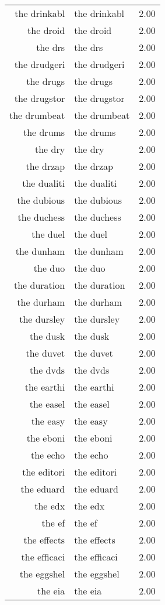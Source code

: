 \begin{table}[ht]
\begin{tabular}{rlr}
  the drinkabl & the drinkabl & 2.00 \\ 
  the droid & the droid & 2.00 \\ 
  the drs & the drs & 2.00 \\ 
  the drudgeri & the drudgeri & 2.00 \\ 
  the drugs & the drugs & 2.00 \\ 
  the drugstor & the drugstor & 2.00 \\ 
  the drumbeat & the drumbeat & 2.00 \\ 
  the drums & the drums & 2.00 \\ 
  the dry & the dry & 2.00 \\ 
  the drzap & the drzap & 2.00 \\ 
  the dualiti & the dualiti & 2.00 \\ 
  the dubious & the dubious & 2.00 \\ 
  the duchess & the duchess & 2.00 \\ 
  the duel & the duel & 2.00 \\ 
  the dunham & the dunham & 2.00 \\ 
  the duo & the duo & 2.00 \\ 
  the duration & the duration & 2.00 \\ 
  the durham & the durham & 2.00 \\ 
  the dursley & the dursley & 2.00 \\ 
  the dusk & the dusk & 2.00 \\ 
  the duvet & the duvet & 2.00 \\ 
  the dvds & the dvds & 2.00 \\ 
  the earthi & the earthi & 2.00 \\ 
  the easel & the easel & 2.00 \\ 
  the easy & the easy & 2.00 \\ 
  the eboni & the eboni & 2.00 \\ 
  the echo & the echo & 2.00 \\ 
  the editori & the editori & 2.00 \\ 
  the eduard & the eduard & 2.00 \\ 
  the edx & the edx & 2.00 \\ 
  the ef & the ef & 2.00 \\ 
  the effects & the effects & 2.00 \\ 
  the efficaci & the efficaci & 2.00 \\ 
  the eggshel & the eggshel & 2.00 \\ 
  the eia & the eia & 2.00 \\ 

\end{tabular}
\end{table}

